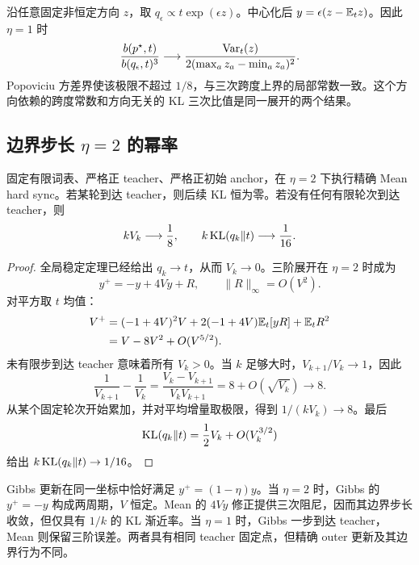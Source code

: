 沿任意固定非恒定方向 $z$，取 $q_\epsilon\propto t\exp(\epsilon z)$。中心化后 $y=\epsilon(z-\mathbb E_tz)$。因此 $\eta=1$ 时
\begin{equation*}
 \frac{b(p^\star,t)}{b(q_\epsilon,t)^3}
 \longrightarrow
 \frac{\operatorname{Var}_t(z)}{2(\max_a z_a-\min_a z_a)^2}.
\end{equation*}
Popoviciu 方差界使该极限不超过 $1/8$，与三次跨度上界的局部常数一致。这个方向依赖的跨度常数和方向无关的 KL 三次比值是同一展开的两个结果。

\subsection{边界步长 \texorpdfstring{$\eta=2$}{eta=2} 的幂率}
\label{dyn:sec:mean-hard-sync-boundary-rate}

\begin{theorem}
\label{dyn:thm:mean-hard-sync-boundary-rate}
固定有限词表、严格正 teacher、严格正初始 anchor，在 $\eta=2$ 下执行精确 Mean hard sync。若某轮到达 teacher，则后续 KL 恒为零。若没有任何有限轮次到达 teacher，则
\begin{equation}
 kV_k\longrightarrow\frac18,
 \qquad k\operatorname{KL}(q_k\Vert t)\longrightarrow\frac1{16}.
 \label{dyn:eq:mean-hard-sync-boundary-rate}
\end{equation}
\end{theorem}

\begin{proof}
全局稳定定理已经给出 $q_k\to t$，从而 $V_k\to0$。三阶展开在 $\eta=2$ 时成为
\begin{equation*}
 y^+=-y+4Vy+R,\qquad \|R\|_\infty=O(V^2).
\end{equation*}
对平方取 $t$ 均值：
\begin{align*}
 V^+
 &=(-1+4V)^2V+2(-1+4V)\mathbb E_t[yR]+\mathbb E_tR^2\\
 &=V-8V^2+O(V^{5/2}).
\end{align*}
未有限步到达 teacher 意味着所有 $V_k>0$。当 $k$ 足够大时，$V_{k+1}/V_k\to1$，因此
\begin{equation*}
 \frac1{V_{k+1}}-\frac1{V_k}
 =\frac{V_k-V_{k+1}}{V_kV_{k+1}}
 =8+O(\sqrt{V_k})\longrightarrow8.
\end{equation*}
从某个固定轮次开始累加，并对平均增量取极限，得到 $1/(kV_k)\to8$。最后
\begin{equation*}
 \operatorname{KL}(q_k\Vert t)=\frac12V_k+O(V_k^{3/2})
\end{equation*}
给出 $k\operatorname{KL}(q_k\Vert t)\to1/16$。
\end{proof}

Gibbs 更新在同一坐标中恰好满足 $y^+=(1-\eta)y$。当 $\eta=2$ 时，Gibbs 的 $y^+=-y$ 构成两周期，$V$ 恒定。Mean 的 $4Vy$ 修正提供三次阻尼，因而其边界步长收敛，但仅具有 $1/k$ 的 KL 渐近率。当 $\eta=1$ 时，Gibbs 一步到达 teacher，Mean 则保留三阶误差。两者具有相同 teacher 固定点，但精确 outer 更新及其边界行为不同。
